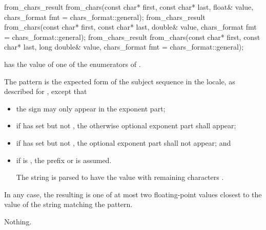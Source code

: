 \documentclass{wg21}
\begin{document}
%
\begin{itemdecl}
    from_chars_result from_chars(const char* first, const char* last, float& value,
    chars_format fmt = chars_format::general);
    from_chars_result from_chars(const char* first, const char* last, double& value,
    chars_format fmt = chars_format::general);
    from_chars_result from_chars(const char* first, const char* last, long double& value,
    chars_format fmt = chars_format::general);
\end{itemdecl}

\begin{itemdescr}
    \pnum
    \expects
     has the value of
    one of the enumerators of .

    \pnum
    \effects
    The pattern is the expected form of the subject sequence
    in the  locale,
    as described for ,
    except that
    \begin{itemize}
        \item
        the sign  may only appear in the exponent part;
        \item
        if  has  set
        but not ,
        the otherwise optional exponent part shall appear;
        \item
        if  has  set
        but not ,
        the optional exponent part shall not appear; and
        \item
        if  is ,
        the prefix  or  is assumed.
        \begin{example}
            The string 
            is parsed to have the value
            with remaining characters .
        \end{example}
    \end{itemize}
    In any case, the resulting  is one of
    at most two floating-point values
    closest to the value of the string matching the pattern.

    \pnum
    \throws
    Nothing.
\end{itemdescr}
\end{document}
